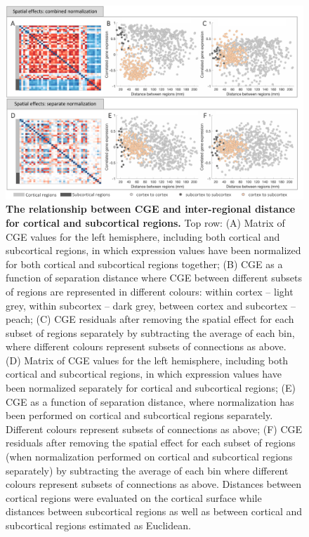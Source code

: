 \begin{figure}[h!]
  \centering
    \includegraphics[width=1\textwidth]{Chapter4/FigureS9.pdf}
\caption{\textbf{The relationship between CGE and inter-regional distance for cortical and subcortical regions.}
Top row: 
(A) Matrix of CGE values for the left hemisphere, including both cortical and subcortical regions, in which expression values have been normalized for both cortical and subcortical regions together; 
(B) CGE as a function of separation distance where CGE between different subsets of regions are represented in different colours: within cortex -- light grey, within subcortex -- dark grey, between cortex and subcortex -- peach; 
(C) CGE residuals after removing the spatial effect for each subset of regions separately by subtracting the average of each bin, where different colours represent subsets of connections as above. 
(D) Matrix of CGE values for the left hemisphere, including both cortical and subcortical regions, in which expression values have been normalized separately for cortical and subcortical regions; 
(E) CGE as a function of separation distance, where normalization has been performed on cortical and subcortical regions separately. Different colours represent subsets of connections as above; 
(F) CGE residuals after removing the spatial effect for each subset of regions (when normalization performed on cortical and subcortical regions separately) by subtracting the average of each bin where different colours represent subsets of connections as above. Distances between cortical regions were evaluated on the cortical surface while distances between subcortical regions as well as between cortical and subcortical regions estimated as Euclidean.}
\label{fig:Ch4Sfig9}
\end{figure}

